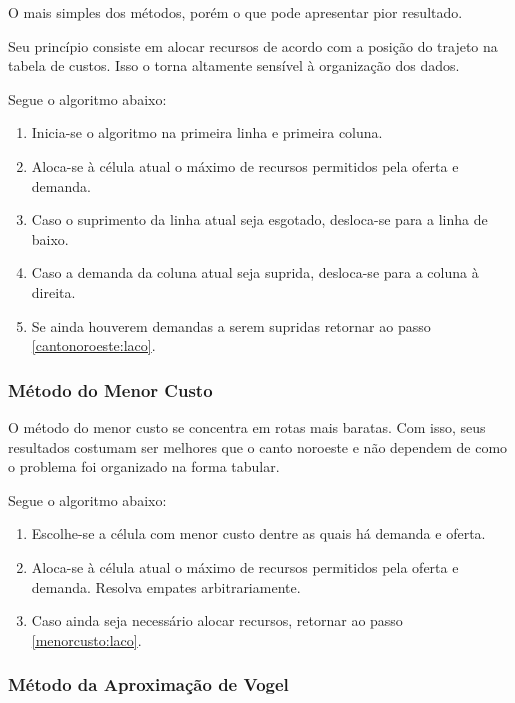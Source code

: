 \documentclass [11pt]{articleSBPO}
\begin{document}
O mais simples dos métodos, porém o que pode apresentar pior resultado.

Seu princípio consiste em alocar recursos de acordo com a posição do trajeto na tabela de custos. Isso o torna altamente sensível à organização dos dados.

Segue o algoritmo abaixo:

\begin{enumerate}
	\item Inicia-se o algoritmo na primeira linha e primeira coluna.
	\item Aloca-se à célula atual o máximo de recursos permitidos pela oferta e demanda. \label{cantonoroeste:laco}
	\item Caso o suprimento da linha atual seja esgotado, desloca-se para a linha de baixo.
	\item Caso a demanda da coluna atual seja suprida, desloca-se para a coluna à direita.
	\item Se ainda houverem demandas a serem supridas retornar ao passo \ref{cantonoroeste:laco}.
\end{enumerate}

\subsubsection{Método do Menor Custo}\label{subsubsec:menorcusto}

O método do menor custo se concentra em rotas mais baratas. Com isso, seus resultados costumam ser melhores que o canto noroeste e não dependem de como o problema foi organizado na forma tabular.

Segue o algoritmo abaixo:

\begin{enumerate}
	\item Escolhe-se a célula com menor custo dentre as quais há demanda e oferta. \label{menorcusto:laco}
	\item Aloca-se à célula atual o máximo de recursos permitidos pela oferta e demanda. Resolva empates arbitrariamente.
	\item Caso ainda seja necessário alocar recursos, retornar ao passo \ref{menorcusto:laco}.
\end{enumerate}

\subsubsection{Método da Aproximação de Vogel}\label{subsubsec:mav}
\end{document}
